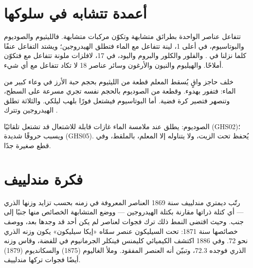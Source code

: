 \section{أعمدة تتشابه في سلوكها}

\begin{proposition}\label{prop:g9:periodic-table-first-look:alike}
تتفاعل عناصر  الواحدة بطرائق متشابهة وتكوّن مركبات متشابهة. فالليثيوم
والصوديوم والبوتاسيوم، في أعلى  1،  لينة تتفاعل مع الماء فتطلق
الهيدروجين؛ ويشتد التفاعل عنفًا كلما نزلنا في . والفلور والكلور
والبروم واليود، في  17، لافلزات ملونة تتفاعل مع  فتكوّن أملاحًا.
والهيليوم والنيون والأرغون وسائر عناصر  18 لا تكاد تتفاعل مع
أي شيء.
\end{proposition}

\begin{inthelab}
خلف حاجز واقٍ يُسقط المعلم قطعة من الليثيوم بحجم حبة الأرز في وعاء كبير من
الماء: فتفور بهدوء. وقطعة من الصوديوم بالحجم نفسه تجري مسرعة على السطح،
وتنصهر فتصير كرة فضية. أما البوتاسيوم فيشتعل فورًا بلهب ليلكي. والثلاثة
تطلق الهيدروجين وتترك .
\end{inthelab}

\begin{safety}{}
الصوديوم: يطلق عند ملامسة الماء غازات قابلة للاشتعال قد تشتعل تلقائيًا
(GHS02)؛ ويسبب حروقًا شديدة (GHS05). يُحفظ تحت الزيت، ولا يتناوله إلا
المعلم، بالملقط، وفي قطع صغيرة جدًا.
\end{safety}

\section{فكرة مندلييف}

\begin{history}
رتّب ديمتري مندلييف سنة 1869 العناصر المعروفة في زمنه بحسب تزايد وزنها
الذري --- أي كتلة ذراتها مقارنة بكتلة  الهيدروجين --- ووضع المتشابهة
الخصائص منها جنبًا إلى جنب. وحيث اقتضى النمط ذلك ترك فجوات لعناصر لم يكن
أحد قد وجدها بعد، ووصف خصائصها سنة 1871: تحت السيليكون عنصر سمّاه
«إيكا سيليكون» يكون وزنه الذري نحو 72. وفي 1886 اكتشف الكيميائي كليمنس
فينكلر الجرمانيوم في  للفضة، وقاس وزنه الذري فوجده 72.3، وتبيّن أنه
العنصر المفقود. وملأ الغاليوم (1875) والسكانديوم (1879) أيضًا فجوات تركها
مندلييف.
\end{history}

